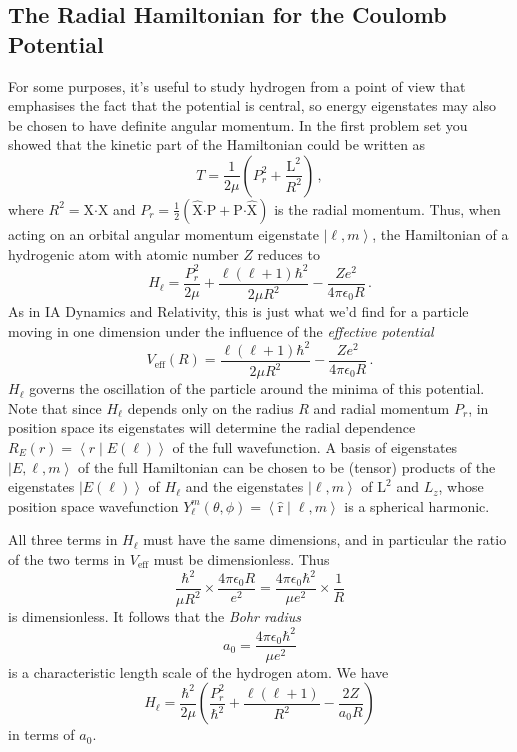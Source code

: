 \documentclass{article}
\theoremstyle{plain}\theoremheaderfont{\normalfont\itshape}\theorembodyfont{\rmfamily}\theoremseparator{.}\newtheorem*{rem}{Remark}\newtheorem*{ex}{Example}\newtheorem*{proof}{Proof}\newtheorem*{altp}{Alternative proof}
\theoremstyle{plain}\theoremheaderfont{\normalfont\bfseries}\theorembodyfont{\rmfamily}\theoremseparator{.}\newtheorem{thm}{Theorem}[section]\newtheorem{lem}[thm]{Lemma}\newtheorem{prop}[thm]{Proposition}\newtheorem*{cor}{Corollary}\newtheorem{defn}[thm]{Definition}\newtheorem{clm}[thm]{Claim}\newtheorem{clminproof}{Claim}
\theoremstyle{break}\theoremheaderfont{\normalfont\itshape}\theorembodyfont{\rmfamily}\theoremseparator{.\medskip}\newtheorem*{proofskip}{Proof}\newtheorem*{exs}{Examples}\newtheorem*{rems}{Remarks}
\theoremstyle{break}\theoremheaderfont{\normalfont\bfseries}\theorembodyfont{\rmfamily}\theoremseparator{.\medskip}\newtheorem{lemskip}[thm]{Lemma}\newtheorem{defnskip}[thm]{Definition}\newtheorem{propskip}[thm]{Proposition}\newtheorem{thmskip}[thm]{Theorem}
\numberwithin{equation}{section}
\newcommand{\ket}[1]{\left| #1 \right\rangle}
\newcommand{\braket}[2]{\left\langle #1 \middle| #2 \right\rangle}
\newcommand{\vb}[1]{\bm{\mathrm{#1}}}
\newcommand{\vu}[1]{\hat{\bm{\mathrm{#1}}}}
\newcommand{\vdot}{\bm{\cdot}}
\begin{document}
    \subsection{The Radial Hamiltonian for the Coulomb Potential}\label{Chap:Coulomb_Radial_Hamiltonian}
    For some purposes, it's useful to study hydrogen from a point of view that emphasises the fact that the potential is central, so energy eigenstates may also be chosen to have definite angular momentum. In the first problem set you showed that the kinetic part of the Hamiltonian could be written as
    \begin{equation}
        T=\frac{1}{2\mu}\left(P_r^2+\frac{\vb{L}^2}{R^2}\right)\,,
    \end{equation}
    where \(R^2=\vb{X}\vdot\vb{X}\) and \(P_r=\frac{1}{2}(\vu{X}\vdot\vb{P}+\vb{P}\vdot\vu{X})\) is the radial momentum. Thus, when acting on an orbital angular momentum eigenstate \(\ket{\ell,m}\), the Hamiltonian of a hydrogenic atom with atomic number \(Z\) reduces to
    \begin{equation}
        H_\ell=\frac{P_r^2}{2\mu}+\frac{\ell(\ell+1)\hbar^2}{2\mu R^2}-\frac{Ze^2}{4\pi\epsilon_0 R}\,.
    \end{equation}
    As in IA Dynamics and Relativity, this is just what we'd find for a particle moving in one dimension under the influence of the \textit{effective potential}
    \begin{equation}
        V_{\text{eff}}(R)=\frac{\ell(\ell+1)\hbar^2}{2\mu R^2}-\frac{Ze^2}{4\pi\epsilon_0 R}\,.
    \end{equation}
    \(H_\ell\) governs the oscillation of the particle around the minima of this potential. Note that since \(H_\ell\) depends only on the radius \(R\) and radial momentum \(P_r\), in position space its eigenstates will determine the radial dependence \(R_E(r)=\braket{r}{E(\ell)}\) of the full wavefunction. A basis of eigenstates \(\ket{E,\ell,m}\) of the full Hamiltonian can be chosen to be (tensor) products of the eigenstates \(\ket{E(\ell)}\) of \(H_\ell\) and the eigenstates \(\ket{\ell,m}\) of \(\vb{L}^2\) and \(L_z\), whose position space wavefunction \(Y_{\ell}^{m}(\theta,\phi)=\braket{\vu{r}}{\ell,m}\) is a spherical harmonic.

    All three terms in \(H_\ell\) must have the same dimensions, and in particular the ratio of the two terms in \(V_{\text{eff}}\) must be dimensionless. Thus
    \begin{equation}
        \frac{\hbar^2}{\mu R^2}\times\frac{4\pi\epsilon_0 R}{e^2}=\frac{4\pi\epsilon_0\hbar^2}{\mu e^2}\times\frac{1}{R}
    \end{equation}
    is dimensionless. It follows that the \textit{Bohr radius}
    \begin{equation}
        a_0=\frac{4\pi\epsilon_0\hbar^2}{\mu e^2}
    \end{equation}
    is a characteristic length scale of the hydrogen atom. We have
    \begin{equation}
        H_\ell=\frac{\hbar^2}{2\mu}\left(\frac{P_r^2}{\hbar^2}+\frac{\ell(\ell+1)}{R^2}-\frac{2Z}{a_0 R}\right)
    \end{equation}
    in terms of \(a_0\).
\end{document}
